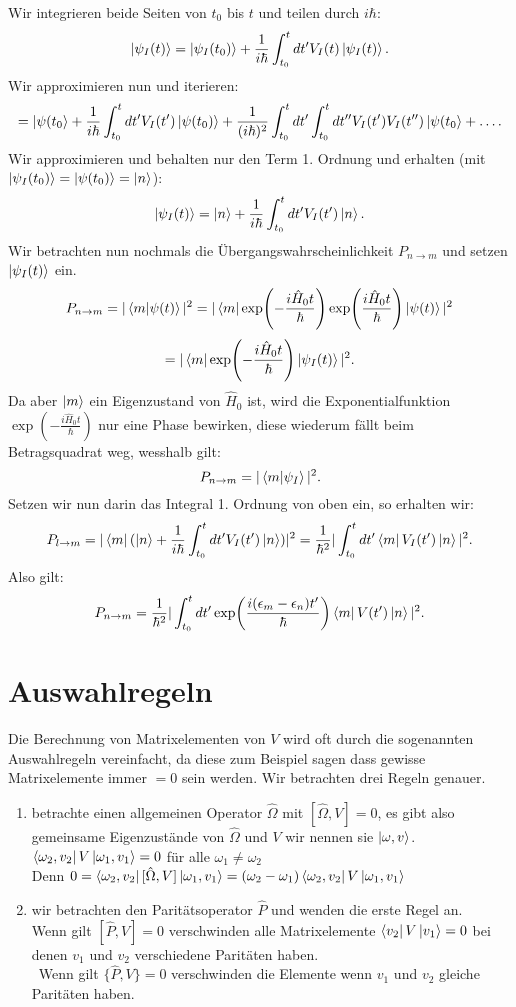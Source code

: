 \documentclass{report}
\begin{document}
Wir integrieren beide Seiten von $t_0$ bis $t$ und teilen durch $i \hbar$: \[
	\ket{\psi_I(t)} = \ket{\psi_I(t_0)} + \frac{1}{i \hbar} \int_{t_0}^t dt' V_I(t) \ket{\psi_I(t)} 
.\] Wir approximieren nun und iterieren: \[
= \ket{\psi(t_0} + \frac{1}{i \hbar } \int_{t_0}^t dt' V_I(t') \ket{\psi(t_0)} + \frac{1}{(i\hbar)^2} \int_{t_0}^t dt' \int_{t_0}^t dt'' V_I(t') V_I(t'') \ket{\psi(t_0} + \ldots
.\] Wir approximieren und behalten nur den Term 1. Ordnung und erhalten (mit $\ket{\psi_I(t_0)} = \ket{\psi(t_0)}  = \ket{n} $): \[
\ket{\psi_I(t)}  = \ket{n} + \frac{1}{i \hbar} \int_{t_0}^t dt' V_I(t') \ket{n} 
.\] Wir betrachten nun nochmals die Übergangswahrscheinlichkeit $P_{n \to m}$ und setzen $\ket{\psi_I(t)} $ ein. \[
P_{n \to  m} = |\bra{m} \ket{\psi(t)} |^2 = |\bra{m} \exp(-\frac{i \hat{H}_0 t}{\hbar}) \exp(\frac{i \hat{H}_0 t}{\hbar}) \ket{\psi(t)}|^2 
\] \[
=  |\bra{m} \exp(- \frac{i \hat{H}_0 t}{\hbar}) \ket{\psi_I(t)}  |^2
.\]  Da aber $\ket{m} $ ein Eigenzustand von $\hat{H}_0$ ist, wird die Exponentialfunktion $\exp(- \frac{i \hat{H}_0 t}{\hbar})$ nur eine Phase bewirken, diese wiederum fällt beim Betragsquadrat weg, wesshalb gilt: \[
P_{n\to m} = |\bra{m} \ket{\psi_I} |^2
.\] Setzen wir nun darin das Integral 1. Ordnung von oben ein, so erhalten wir: \[
P_{l \to  m} = |\bra{m} (\ket{n} + \frac{1}{i \hbar} \int_{t_0}^t dt' V_I(t') \ket{n} )|^2 = \frac{1}{\hbar^2} |\int_{t_0}^t dt' \bra{m} V_I(t') \ket{n} |^2
.\]  Also gilt: \[
P_{n\to m} = \frac{1}{\hbar^2} |\int_{t_0}^t dt' \exp(\frac{i (\epsilon_m - \epsilon_n) t'}{\hbar}) \bra{m} V(t') \ket{n}|^2 
.\] 
\section{Auswahlregeln}
Die Berechnung von Matrixelementen von $V$ wird oft durch die sogenannten Auswahlregeln vereinfacht, da diese zum Beispiel sagen dass gewisse Matrixelemente immer $=0$ sein werden. Wir betrachten drei Regeln genauer.
\begin{enumerate}
	\item betrachte einen allgemeinen Operator $\hat{\Omega}$ mit $[\hat{\Omega}, V] = 0$, es gibt also gemeinsame Eigenzustände von $\hat{\Omega}$ und $V$ wir nennen sie $\ket{\omega, v} $. \\
		$\bra{\omega_2, v_2} V \ket{\omega_1, v_1} = 0$ für alle $\omega_1 \neq \omega_2$ \\
		Denn $0 = \bra{\omega_2, v_2} [\hat{\Omega}, V] \ket{\omega_1, v_1} = \left( \omega_2 - \omega_1 \right) \bra{\omega_2,v_2} V \ket{\omega_1, v_1}$ 
	\item wir betrachten den Paritätsoperator $\hat{P}$ und wenden die erste Regel an.\\
		Wenn gilt $[\hat{P},V]=0$ verschwinden alle Matrixelemente $\bra{v_2} V \ket{v_1} =0 $ bei denen $v_1$ und $v_2$ verschiedene Paritäten haben. \\
	\	Wenn gilt $\{\hat{P}, V\} = 0$ verschwinden die Elemente wenn $v_1$ und $v_2$ gleiche Paritäten haben.
\end{enumerate}
\end{document}
